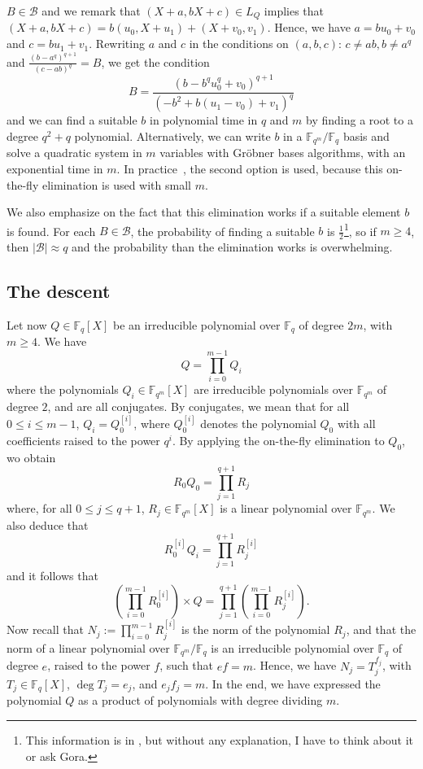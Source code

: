 \documentclass[a4paper,11pt]{article}
\theoremstyle{break}
\theoremstyle{sc}
\theoremstyle{definition}
\theoremstyle{remark}
\begin{document}
$B\in \mathcal B$ and we remark that $(X+a,
bX+c)\in L_Q$ implies that $(X+a, bX+c)=b(u_0, X+u_1)+(X+v_0, v_1)$. Hence, we
have $a=bu_0+v_0$ and $c=bu_1+v_1$. Rewriting $a$ and $c$ in the conditions
on $(a,b,c)$: $c\neq ab,b\neq a^q$ and $\frac{(b-a^q)^{q+1}}{(c-ab)^q}=B$, we
get the condition
\[
  B = \frac{(b-b^qu_0^q+v_0)^{q+1}}{(-b^2+b(u_1-v_0)+v_1)^q}
\]
and we can find a suitable $b$ in polynomial time in $q$ and $m$ by finding a root to a degree
$q^2+q$ polynomial. Alternatively, we can write $b$ in a $\mathbb{F}_{q^m}/\mathbb{F}_q$
basis and solve a quadratic system in $m$ variables with Gröbner bases
algorithms, with an exponential time in $m$. In practice~\cite{Adj16}, the
second option is used, because this on-the-fly elimination is used with small $m$.

We also emphasize on the fact that this elimination works if a suitable element
$b$ is found. For each $B\in\mathcal B$, the probability of finding a suitable
$b$ is $\frac{1}{2}$\footnote{This information is in \cite{Adj16}, but
without any explanation, I have to think about it or ask Gora.}, so if
$m\geq4$, then $|\mathcal B|\approx q$ and the probability than the
elimination works is overwhelming.

\subsection{The descent}

Let now $Q\in\mathbb{F}_{q}[X]$ be an irreducible polynomial over $\mathbb{F}_{q}$ of degree
$2m$, with $m\geq4$. We have
\[
  Q = \prod_{i=0}^{m-1}Q_{i}
\]
where the polynomials $Q_i\in\mathbb{F}_{q^m}[X]$ are irreducible
polynomials over $\mathbb{F}_{q^m}$ of degree $2$, and are all
conjugates. By conjugates, we mean that for all $0\leq i\leq m-1$,
$Q_i=Q_0^{[i]}$, where $Q_0^{[i]}$ denotes the polynomial $Q_0$ with all
coefficients raised to the power $q^i$. By applying the on-the-fly
elimination to $Q_0$, wo obtain 
\[
  R_0Q_0=\prod_{j=1}^{q+1}R_j
\]
where, for all $0\leq j\leq q+1$, $R_j\in\mathbb{F}_{q^m}[X]$ is a linear
polynomial over $\mathbb{F}_{q^m}$. We also deduce that
\[
  R_{0}^{[i]}Q_i=\prod_{j=1}^{q+1}R_j^{[i]}
\]
and it follows that
\[
  (\prod_{i=0}^{m-1}R_{0}^{[i]})\times Q =
  \prod_{j=1}^{q+1}(\prod_{i=0}^{m-1}R_j^{[i]}).
\]
Now recall that $N_j:=\prod_{i=0}^{m-1}R_{j}^{[i]}$ is the norm of the
polynomial $R_j$, and that the norm of a linear polynomial over
$\mathbb{F}_{q^m}/\mathbb{F}_q$ is an irreducible polynomial over
$\mathbb{F}_q$ of degree
$e$, raised to the power $f$, such that $ef=m$. Hence, we have
$N_j=T_j^{f_j}$, with $T_j\in\mathbb{F}_{q}[X]$, $\deg T_j = e_j$, and
$e_jf_j=m$. In the end, we have expressed the polynomial $Q$ as a product of
polynomials with degree dividing $m$.
\end{document}
